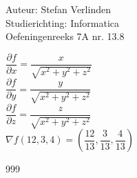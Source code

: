 \documentclass[a4paper]{article}
\begin{document}
  
\noindent \large Auteur: Stefan Verlinden \\
\noindent \large Studierichting: Informatica\\
\noindent \large Oefeningenreeks 7A nr. 13.8\\

\medskip

\normalsize

$\dfrac{\partial f}{\partial x} = \dfrac{x}{\sqrt{x^2 + y^2 + z^2}}$\\

$\dfrac{\partial f}{\partial y} = \dfrac{y}{\sqrt{x^2 + y^2 + z^2}}$\\

$\dfrac{\partial f}{\partial z} = \dfrac{z}{\sqrt{x^2 + y^2 + z^2}}$\\

$\nabla f(12, 3, 4) = \left(\dfrac{12}{13}, \dfrac{3}{13}, \dfrac{4}{13}\right)$\\

\begin{thebibliography}{999}
\end{thebibliography}
\end{document}
